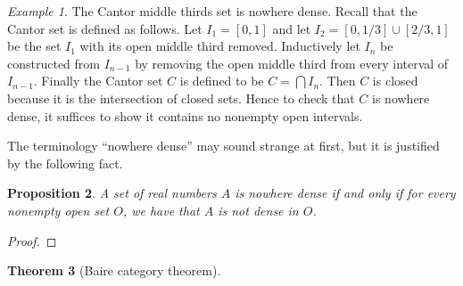 \documentclass[11pt,oneside]{amsart}
\newtheorem{thm}{Theorem}[section]
\newtheorem{prop}[thm]{Proposition}
\theoremstyle{definition}
\theoremstyle{remark}
\newtheorem{example}[thm]{Example}
\begin{document}
\begin{example}
  The Cantor middle thirds set is nowhere dense. Recall that the Cantor set is defined as follows. Let $I_1=[0,1]$ and let $I_2=[0,1/3]\cup[2/3,1]$ be the set $I_1$ with its open middle third removed. Inductively let $I_n$ be constructed from $I_{n-1}$ by removing the open middle third from every interval of $I_{n-1}$. Finally the Cantor set $C$ is defined to be $C=\bigcap I_n$. Then $C$ is closed because it is the intersection of closed sets. Hence to check that $C$ is nowhere dense, it suffices to show it contains no nonempty open intervals.
\end{example}

The terminology ``nowhere dense'' may sound strange at first, but it is justified by the following fact.

\begin{prop}
  A set of real numbers $A$ is nowhere dense if and only if for every nonempty open set $O$, we have that $A$ is not dense in $O$.
\end{prop}

\begin{proof}
  
\end{proof}

\begin{thm}[Baire category theorem]
  
\end{thm}
\end{document}
